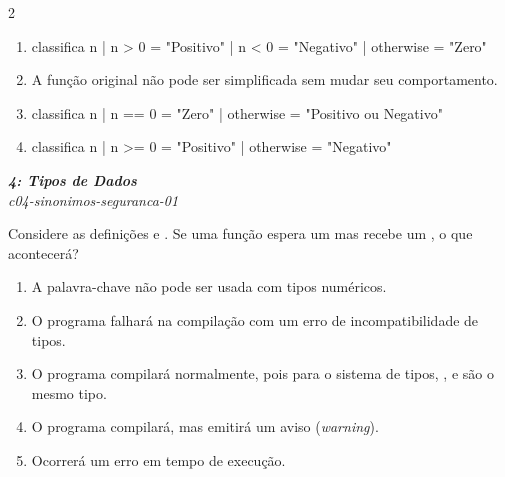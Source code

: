 \documentclass[a4paper,10pt,brazil]{article}
\begin{document}
\begin{multicols}{2}
\begin{enumerate}
  \item \begin{haskellcode}
classifica n
  | n > 0     = "Positivo"
  | n < 0     = "Negativo"
  | otherwise = "Zero"
\end{haskellcode}

  \item A função original não pode ser simplificada sem mudar seu comportamento.

  \item \begin{haskellcode}
classifica n
  | n == 0    = "Zero"
  | otherwise = "Positivo ou Negativo"
\end{haskellcode}

  \item \begin{haskellcode}
classifica n
  | n >= 0    = "Positivo"
  | otherwise = "Negativo"
\end{haskellcode}


\end{enumerate}

\begin{flushright}
  \footnotesize
  \textit{\textbf{4: Tipos de Dados}}\\
  \textit{c04-sinonimos-seguranca-01}\\

\end{flushright}
Considere as definições  e . Se uma função espera um  mas recebe um , o que acontecerá?

\begin{enumerate}
  \item A palavra-chave  não pode ser usada com tipos numéricos.

  \item O programa falhará na compilação com um erro de incompatibilidade de tipos.

  \item O programa compilará normalmente, pois para o sistema de tipos, ,  e  são o mesmo tipo.

  \item O programa compilará, mas emitirá um aviso (\emph{warning}).

  \item Ocorrerá um erro em tempo de execução.



\end{enumerate}
\end{multicols}
\end{document}
